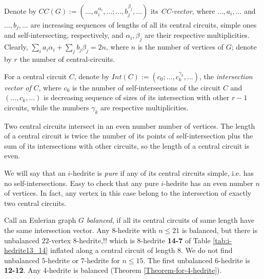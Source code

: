 \documentclass[12pt]{article}
\begin{document}


Denote by 
$CC(G):=(...,a_i^{\alpha_i},...;...,b_j^{\beta_j},...)$ its {\it CC-vector}, 
where $...,a_i,...$ and  $...,b_j,...$ are increasing sequences of lengths of 
all its central circuits, simple ones and self-intersecting, respectively, 
and $\alpha_i, \beta_j$ are their respective multiplicities.
Clearly, $\sum_{i} a_i{\alpha_i}+ \sum_{j} b_j{\beta_j}=2n$, where 
$n$ is the number of vertices of $G$; denote by $r$ the number of 
central-circuits.


For a central circuit $C$, denote by $Int(C):=(c_0;...,c_k^{\gamma_k},...)$,
the {\em intersection vector of} $C$, where $c_0$ is
the number of self-intersections of the circuit $C$ and $(...,c_k,...)$ is
decreasing sequence of sizes of its intersection with other $r-1$ 
circuits, while the numbers $\gamma_k$ are respective multiplicities.


Two central circuits intersect in an even number number of vertices. 
The length of a central circuit is twice the number of its points of 
self-intersection plus the sum of its intersections with other circuits, 
so the length of a central circuit is even.



We will say that an $i$-hedrite is {\it pure} if any of its central circuits 
simple, i.e. has no self-intersections.
Easy to check that any pure $i$-hedrite has an even number $n$ of 
vertices. In fact, any vertex in this case belong to the intersection 
of exactly two central circuits.


Call an Eulerian graph $G$ {\it balanced}, if all its central circuits of
same length have the same intersection vector.
Any $8$-hedrite with $n \le 21$ is balanced, but there is unbalanced
$22$-vertex $8$-hedrite,!! which is $8$-hedrite {\bf 14-7} of Table 
\ref{tab:i-hedrite13_14} inflated along a central circuit of length $8$.
We do not find unbalanced $5$-hedrite or $7$-hedrite for $n\leq 15$. The
first unbalanced $6$-hedrite is {\bf 12-12}. Any $4$-hedrite is balanced
(Theorem \ref{Theorem-for-4-hedrite}).
\end{document}
